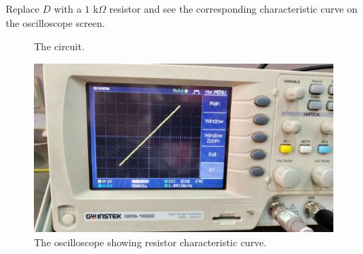 \documentclass[11pt]{article}
\newcommand{\PicScale}{0.2}
\begin{document}
\begin{question}
\begin{subquestion}{Replace $D$ with a $1$ k$\Omega$ resistor and see the corresponding characteristic curve on the oscilloscope screen.}
{\begin{figure}[H]
                \caption{The circuit.}
            \end{figure}
            \begin{figure}[H]
                \centering
                \includegraphics[scale=\PicScale,angle=0]{Fig/41.jpeg}
                \caption{The oscilloscope showing resistor characteristic curve.}
            \end{figure}
        }
    \end{subquestion}


\end{question}
\end{document}
